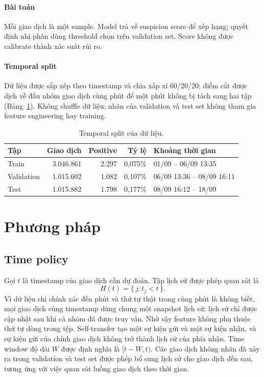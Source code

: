 \documentclass[sigconf,nonacm]{acmart}
\begin{document}
\paragraph{Bài toán} Mỗi giao dịch là một sample. Model trả về suspicion score để xếp hạng; quyết định nhị phân dùng
threshold chọn trên validation set. Score không được calibrate thành xác suất rủi ro.

\paragraph{Temporal split} Dữ liệu được sắp xếp theo timestamp và chia xấp xỉ 60/20/20; điểm cắt được dịch về đầu
nhóm giao dịch cùng phút để một phút không bị tách sang hai tập (Bảng~\ref{tab:split}). Không shuffle dữ liệu; nhãn
của validation và test set không tham gia feature engineering hay training.

\begin{table}[t]
\caption{Temporal split của dữ liệu.}
\label{tab:split}
\small
\setlength{\tabcolsep}{4pt}
\begin{tabular}{lrrrl}
\toprule
Tập & Giao dịch & Positive & Tỷ lệ & Khoảng thời gian \\
\midrule
Train & 3.046.861 & 2.297 & 0,075\% & 01/09 -- 06/09 13:35 \\
Validation & 1.015.602 & 1.082 & 0,107\% & 06/09 13:36 -- 08/09 16:11 \\
Test & 1.015.882 & 1.798 & 0,177\% & 08/09 16:12 -- 18/09 \\
\bottomrule
\end{tabular}
\end{table}

\section{Phương pháp}

\subsection{Time policy}

Gọi $t$ là timestamp của giao dịch cần dự đoán. Tập lịch sử được phép quan sát là
\begin{equation}
H(t) = \{\, j : t_j < t \,\}.
\end{equation}
Vì dữ liệu chỉ chính xác đến phút và thứ tự thật trong cùng phút là không biết, mọi giao dịch cùng timestamp dùng chung
một snapshot lịch sử; lịch sử chỉ được cập nhật sau khi cả nhóm đã được truy vấn. Nhờ vậy feature không phụ thuộc thứ
tự dòng trong tệp. Self-transfer tạo một sự kiện gửi và một sự kiện nhận, và sự kiện gửi của chính giao dịch không trở
thành lịch sử của phía nhận. Time window độ dài $W$ được định nghĩa là $[t-W, t)$. Các giao dịch không nhãn đã xảy
ra trong validation và test set được phép bổ sung lịch sử cho giao dịch đến sau, tương ứng với việc quan sát luồng
giao dịch theo thời gian.
\end{document}

